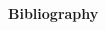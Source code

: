 \documentclass{beamer}                             %
\newcommand{\blocktitle}[1]{{\Large \textbf{#1}}}
\begin{document}
\begin{frame}[t]
\begin{columns}[T]
\begin{column}{0.30\textwidth}
  \begin{tcolorbox}
    \blocktitle{Bibliography}
       \printbibliography
  \end{tcolorbox}
\end{column}

\end{columns}

\end{frame}
\end{document}
